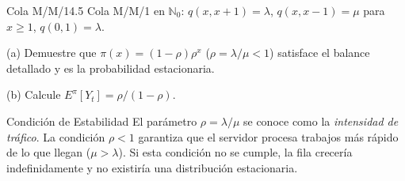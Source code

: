 \documentclass[10pt,a4paper]{article}
\begin{document}
\begin{ejercicio}{Cola M/M/1}{4.5}
    Cola M/M/1 en $\mathbb{N}_0$: $q(x, x+1) = \lambda$, $q(x, x-1) = \mu$ para $x \ge 1$, $q(0, 1) = \lambda$.
    
    (a) Demuestre que $\pi(x) = (1-\rho)\rho^x$ ($\rho = \lambda/\mu < 1$) satisface el balance detallado y es la probabilidad estacionaria.
    
    (b) Calcule $E^\pi[Y_t] = \rho/(1-\rho)$.
\end{ejercicio}

\vspace{2mm}

\begin{nota}{Condición de Estabilidad}
    El parámetro $\rho = \lambda/\mu$ se conoce como la \textit{intensidad de tráfico}. La condición $\rho < 1$ garantiza que el servidor procesa trabajos más rápido de lo que llegan ($\mu > \lambda$). Si esta condición no se cumple, la fila crecería indefinidamente y no existiría una distribución estacionaria.
\end{nota}
\end{document}
